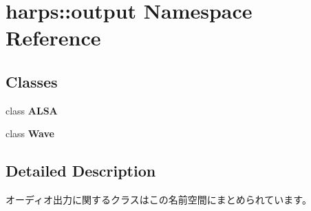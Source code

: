 \section{harps::output Namespace Reference}
\label{namespaceharps_1_1output}


\subsection*{Classes}
\begin{CompactItemize}
\item 
class {\bf ALSA}
\item 
class {\bf Wave}
\end{CompactItemize}


\subsection{Detailed Description}
オーディオ出力に関するクラスはこの名前空間にまとめられています。 